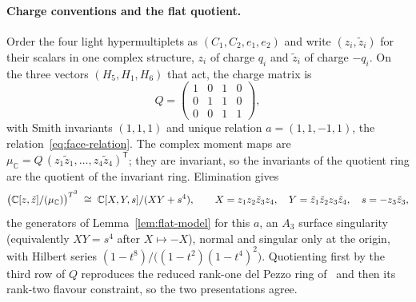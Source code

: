 \paragraph{Charge conventions and the flat quotient.}
Order the four light hypermultiplets as $(C_1,C_2,e_1,e_2)$ and write $(z_i,\tilde z_i)$ for
their scalars in one complex structure, $z_i$ of charge $q_i$ and $\tilde z_i$ of charge $-q_i$. On the
three vectors $(H_5,H_1,H_6)$ that act, the charge matrix is
\begin{equation}
 Q=\begin{pmatrix}1&0&1&0\\0&1&1&0\\0&0&1&1\end{pmatrix},
 \label{eq:app-Q}
\end{equation}
with Smith invariants $(1,1,1)$ and unique relation $a=(1,1,-1,1)$, the relation~\eqref{eq:face-relation}. The complex moment maps
are $\mu_{\mathbb C}=Q\,(z_1\tilde z_1,\dots,z_4\tilde z_4)^{\mathsf T}$; they are invariant, so the
invariants of the quotient ring are the quotient of the invariant ring. Elimination gives
\begin{equation}
 \bigl(\mathbb C[z,\tilde z]/(\mu_{\mathbb C})\bigr)^{T^3}
 \;\cong\;\mathbb C[X,Y,s]/(XY+s^4),\qquad
 X=z_1z_2\tilde z_3z_4,\quad Y=\tilde z_1\tilde z_2z_3\tilde z_4,\quad s=-z_3\tilde z_3,
 \label{eq:app-ring}
\end{equation}
the generators of Lemma~\ref{lem:flat-model} for this $a$, an $A_3$ surface singularity (equivalently
$XY=s^4$ after $X\mapsto-X$), normal and singular only at the origin, with Hilbert series
$(1-t^8)/\bigl((1-t^2)(1-t^4)^2\bigr)$. Quotienting first by the third row of $Q$
reproduces the reduced rank-one del Pezzo ring of~\cite{W26quantum} and then its rank-two
flavour constraint, so the two presentations agree.

